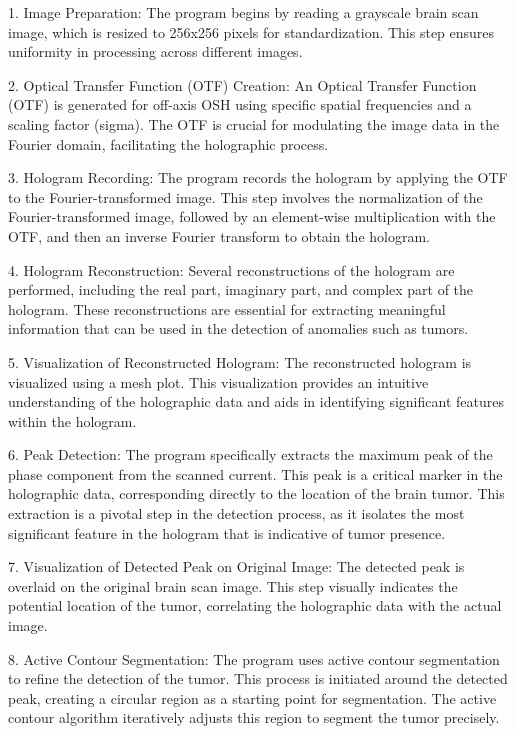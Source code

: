 \begin{appendices}
1. Image Preparation: The program begins by reading a grayscale brain scan image, which is resized to 256x256 pixels for standardization. This step ensures uniformity in processing across different images.

2. Optical Transfer Function (OTF) Creation: An Optical Transfer Function (OTF) is generated for off-axis OSH using specific spatial frequencies and a scaling factor (sigma). The OTF is crucial for modulating the image data in the Fourier domain, facilitating the holographic process.

3. Hologram Recording: The program records the hologram by applying the OTF to the Fourier-transformed image. This step involves the normalization of the Fourier-transformed image, followed by an element-wise multiplication with the OTF, and then an inverse Fourier transform to obtain the hologram.

4. Hologram Reconstruction: Several reconstructions of the hologram are performed, including the real part, imaginary part, and complex part of the hologram. These reconstructions are essential for extracting meaningful information that can be used in the detection of anomalies such as tumors.

5. Visualization of Reconstructed Hologram: The reconstructed hologram is visualized using a mesh plot. This visualization provides an intuitive understanding of the holographic data and aids in identifying significant features within the hologram.

6. Peak Detection: The program specifically extracts the maximum peak of the phase component from the scanned current. This peak is a critical marker in the holographic data, corresponding directly to the location of the brain tumor. This extraction is a pivotal step in the detection process, as it isolates the most significant feature in the hologram that is indicative of tumor presence.

7. Visualization of Detected Peak on Original Image: The detected peak is overlaid on the original brain scan image. This step visually indicates the potential location of the tumor, correlating the holographic data with the actual image.

8. Active Contour Segmentation: The program uses active contour segmentation to refine the detection of the tumor. This process is initiated around the detected peak, creating a circular region as a starting point for segmentation. The active contour algorithm iteratively adjusts this region to segment the tumor precisely.


\end{appendices}

